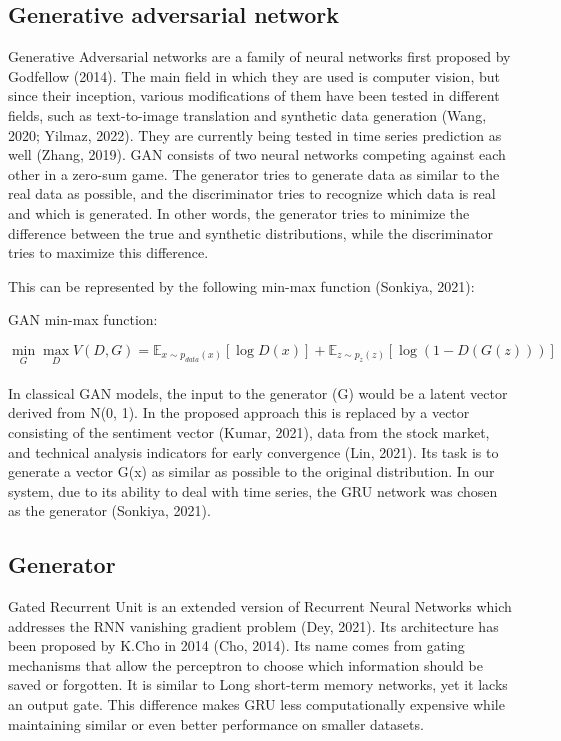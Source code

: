 \documentclass[review]{elsarticle} %
\begin{document}
\subsection{Generative adversarial network}

Generative Adversarial networks are a family of neural networks first proposed by Godfellow (2014). The main field in which they are used is computer vision, but since their inception, various modifications of them have been tested in different fields, such as text-to-image translation and synthetic data generation (Wang, 2020; Yilmaz, 2022). They are currently being tested in time series prediction as well (Zhang, 2019).  GAN consists of two neural networks competing against each other in a zero-sum game. The generator tries to generate data as similar to the real data as possible, and the discriminator tries to recognize which data is real and which is generated. In other words, the generator tries to minimize the difference between the true and synthetic distributions, while the discriminator tries to maximize this difference. 

\pagebreak
\noindent This can be represented by the following min-max function (Sonkiya, 2021): 


\begin{center}   GAN min-max function: \end{center}
\begin{equation} \min_G \max_D V(D, G)=
\mathbb{E}_{x\sim p_{data}(x)}[\log D(x)]
+ \mathbb{E}_{z\sim p_z(z)}[\log(1 - D(G(z)))] \end{equation}\\

In classical GAN models, the input to the generator (G) would be a latent vector derived from N(0, 1). In the proposed approach this is replaced by a vector consisting of the sentiment vector (Kumar, 2021), data from the stock market, and technical analysis indicators for early convergence (Lin, 2021). Its task is to generate a vector G(x) as similar as possible to the original distribution. In our system, due to its ability to deal with time series, the GRU network was chosen as the generator (Sonkiya, 2021). 


\subsection{Generator}

Gated Recurrent Unit is an extended version of Recurrent Neural Networks which addresses the RNN vanishing gradient problem (Dey, 2021).
Its architecture has been proposed by K.Cho in 2014 (Cho, 2014). Its name comes from gating mechanisms that allow the perceptron to choose which information should be saved or forgotten. It is similar to Long short-term memory networks, yet it lacks an output gate. This difference makes GRU less computationally expensive while maintaining similar or even better performance on smaller datasets. 
\end{document}
